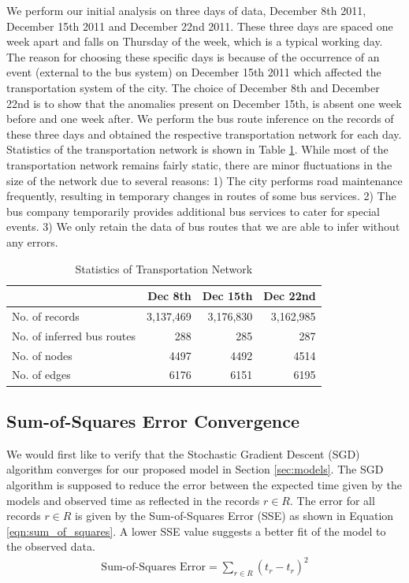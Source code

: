 \documentclass[conference]{IEEEtran.1.8}
\begin{document}
We perform our initial analysis on three days of data, December 8th 2011, December 15th 2011 and December 22nd 2011. These three days are spaced one week apart and falls on Thursday of the week, which is a typical working day. The reason for choosing these specific days is because of the occurrence of an event (external to the bus system) on December 15th 2011 which affected the transportation system of the city. The choice of December 8th and December 22nd is to show that the anomalies present on December 15th, is absent one week before and one week after. We perform the bus route inference on the records of these three days and obtained the respective transportation network for each day. Statistics of the transportation network is shown in Table \ref{tbl:statistics}. While most of the transportation network remains fairly static, there are minor fluctuations in the size of the network due to several reasons: 1) The city performs road maintenance frequently, resulting in temporary changes in routes of some bus services. 2) The bus company temporarily provides additional bus services to cater for special events. 3) We only retain the data of bus routes that we are able to infer without any errors.
\begin{table}[htb]
	\centering
	\caption{Statistics of Transportation Network}
	\label{tbl:statistics}
	\begin{tabular}{|p{2.1cm}|r|r|r|}
		\hline
			& Dec 8th & Dec 15th & Dec 22nd \\
		\hline
		No. of records & 3,137,469 & 3,176,830 & 3,162,985 \\
		\hline
		No. of inferred bus routes & 288 & 285 & 287 \\
		\hline
		No. of nodes & 4497 & 4492 & 4514 \\
		\hline
		No. of edges & 6176 & 6151 & 6195 \\
		\hline
	\end{tabular}
\end{table}

\subsection{Sum-of-Squares Error Convergence}

We would first like to verify that the Stochastic Gradient Descent (SGD) algorithm converges for our proposed model in Section \ref{sec:models}. The SGD algorithm is supposed to reduce the error between the expected time given by the models and observed time as reflected in the records $r \in R$. The error for all records $r \in R$ is given by the Sum-of-Squares Error (SSE) as shown in Equation \ref{eqn:sum_of_squares}. A lower SSE value suggests a better fit of the model to the observed data.
\begin{align}
	\label{eqn:sum_of_squares}
	\text{Sum-of-Squares Error} = \sum_{r \in R} (t_r - \hat{t}_r)^2 
\end{align}
\end{document}
